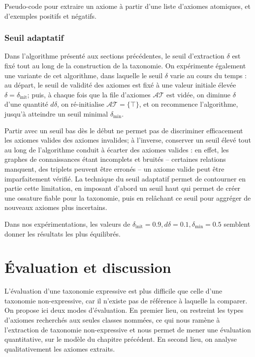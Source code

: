 \begin{algorithm}[h]
 \caption{Pseudo-code pour extraire un axiome à partir d'une liste d'axiomes atomiques, et d'exemples positifs et négatifs.}
 \label{algo:extraction}
\end{algorithm}

\FloatBarrier

\subsubsection{Seuil adaptatif}


Dans l'algorithme présenté aux sections précédentes, le seuil d'extraction $\delta$ est fixé tout au long de la construction de la taxonomie.
On expérimente également une variante de cet algorithme,
dans laquelle le seuil $\delta$ varie au cours du temps : au départ, le seuil de validité des axiomes est fixé à une valeur initiale élevée $\delta = \delta_\text{init}$; puis, à chaque fois que la file d'axiomes $\mathcal{AT}$ est vidée, on diminue $\delta$ d'une quantité $d\delta$, on ré-initialise $\mathcal{AT} = \{ \top \}$, et on recommence l'algorithme, jusqu'à atteindre un seuil minimal $\delta_\text{min}$. 

Partir avec un seuil bas dès le début ne permet pas de discriminer efficacement les axiomes valides des axiomes invalides; à l'inverse, conserver un seuil élevé tout au long de l'algorithme conduit à écarter des axiomes valides : en effet, les graphes de connaissances étant incomplets et bruités – certaines relations manquent, des triplets peuvent être erronés – un axiome valide peut être imparfaitement vérifié. La technique du seuil adaptatif permet de contourner en partie cette limitation, en imposant d'abord un seuil haut qui permet de créer une ossature fiable pour la taxonomie, puis en relâchant ce seuil pour aggréger de nouveaux axiomes plus incertains.

Dans nos expérimentations, les valeurs de $\delta_\text{init} = 0.9, d\delta = 0.1, \delta_\text{min} = 0.5$ semblent donner les résultats les plus équilibrés.
\section{Évaluation et discussion}
\label{sec:texp-results}

L'évaluation d'une taxonomie expressive est plus difficile
que celle d'une taxonomie non-expressive, car il n'existe pas de référence à laquelle la comparer. On propose ici deux modes d'évaluation. En premier lieu, on restreint les types d'axiomes recherchés aux seules classes nommées, ce qui nous ramène à l'extraction de taxonomie non-expressive et nous permet de mener une évaluation quantitative, sur le modèle du chapitre précédent. %
En second lieu, on analyse qualitativement les axiomes extraits.


